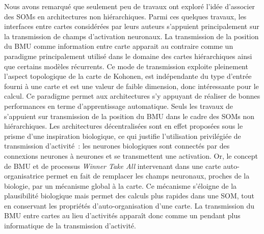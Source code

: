 \documentclass[../main]{subfiles}
\begin{document}
Nous avons remarqué que seulement peu de travaux ont exploré l'idée d'associer des SOMs en architectures non hiérarchiques.
Parmi ces quelques travaux, les interfaces entre cartes considérées par leurs auteurs s'appuient principalement sur la transmission de champs d'activation neuronaux.
La transmission de la position du BMU comme information entre carte apparait au contraire comme un paradigme principalement utilisé dans le domaine des cartes hiérarchiques ainsi que certains modèles récurrents.
Ce mode de transmission exploite pleinement l'aspect topologique de la carte de Kohonen, est indépendante du type d'entrée fourni à une carte et est une valeur de faible dimension, donc intéressante pour le calcul. Ce paradigme permet aux architectures s'y appuyant de réaliser de bonnes performances en terme d'apprentissage automatique.
Seuls les travaux de \cite{dominey13} s'appuient sur transmission de la position du BMU dans le cadre des SOMs non hiérarchiques.
Les architectures décentralisées sont en effet proposées sous le prisme d'une inspiration biologique, ce qui justifie l'utilisation privilégiée de transmission d'activité~: les neurones biologiques sont connectés par des connexions neurones à neurones et se transmettent une activation. 
Or, le concept de BMU et de processus \emph{Winner Take All} intervenant dans une carte auto-organisatrice permet en fait de remplacer les champs neuronaux, proches de la biologie,  par un mécanisme global à la carte. Ce mécanisme s'éloigne de la plausibilité biologique mais permet des calculs plus rapides dans une SOM, tout en conservant les propriétés d'auto-organisation d'une carte. La transmission du BMU entre cartes au lieu d'activités apparaît donc comme un pendant plus informatique de la transmission d'activité.
\end{document}

